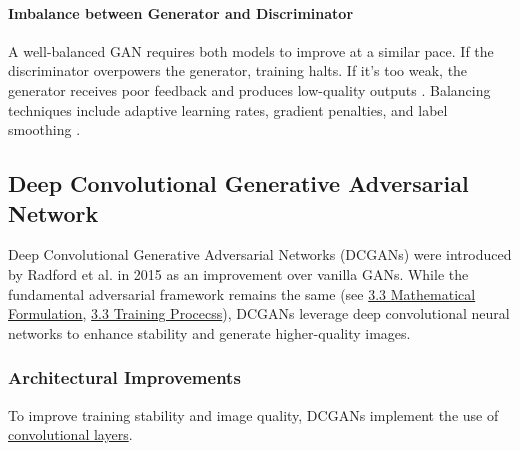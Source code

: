 \paragraph[Imbalance between Generator and Discriminator]{Imbalance between Generator and Discriminator}
A well-balanced GAN requires both models to improve at a similar pace. If the discriminator overpowers the generator, training halts. If it's too weak, the generator receives poor feedback and produces low-quality outputs \cite{goodfellow2014generativeadversarialnetworks}. Balancing techniques include adaptive learning rates, gradient penalties, and label smoothing \cite{Radford2015DCGAN}.


\subsection[Deep Convolutional Generative Adversarial Network - DCGAN]{Deep Convolutional Generative Adversarial Network}\label{theoretical_dcgan}
Deep Convolutional Generative Adversarial Networks (DCGANs) were introduced by Radford et al. in 2015 \cite{Radford2015DCGAN} as an improvement over vanilla GANs. While the fundamental adversarial framework remains the same (see \hyperref[theoretical_gan_math]{3.3 Mathematical Formulation}, \hyperref[theoretical_gan_training]{3.3 Training Procecss}), DCGANs leverage deep convolutional neural networks to enhance stability and generate higher-quality images.

\subsubsection{Architectural Improvements}\label{theorey_dcgan_architecture}
To improve training stability and image quality, DCGANs implement the use of \hyperref[theoretical_classification_conv_layers]{convolutional layers}.

